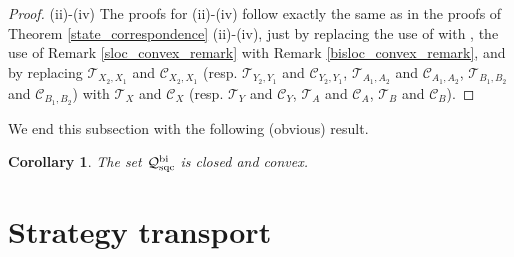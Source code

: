 \documentclass[11pt]{amsart}
\newtheorem{corollary}[theorem]{Corollary}
\newcommand{\cl}[1]{\mathcal{#1}}
\begin{document}
\begin{proof}
(ii)-(iv) The proofs for (ii)-(iv) follow exactly the same as in the proofs of Theorem \ref{state_correspondence} (ii)-(iv), just by replacing the use of \cite[Theorem 5.2]{tt} with \cite[Theorem 3.4]{bhtt}, the use of Remark \ref{sloc_convex_remark} with Remark \ref{bisloc_convex_remark}, and by replacing $\cl{T}_{X_{2}, X_{1}}$ and $\cl{C}_{X_{2}, X_{1}}$ (resp. $\cl{T}_{Y_{2}, Y_{1}}$ and $\cl{C}_{Y_{2}, Y_{1}}$, $\cl{T}_{A_{1}, A_{2}}$ and $\cl{C}_{A_{1}, A_{2}}$, $\cl{T}_{B_{1}, B_{2}}$ and $\cl{C}_{B_{1}, B_{2}}$) with $\cl{T}_{X}$ and $\cl{C}_{X}$ (resp. $\cl{T}_{Y}$ and $\cl{C}_{Y}$, $\cl{T}_{A}$ and $\cl{C}_{A}$, $\cl{T}_{B}$ and $\cl{C}_{B}$). 
\end{proof}

We end this subsection with the following (obvious) result.

\begin{corollary}
The set $\cl{Q}_{\rm sqc}^{\rm bi}$ is closed and convex.
\end{corollary}


\section{Strategy transport}\label{strat_transport}
\end{document}

